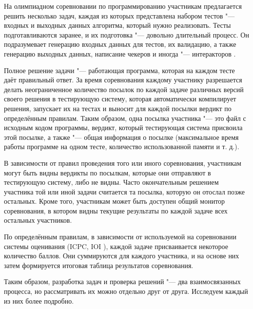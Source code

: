На олимпиадном соревновании по программированию участникам предлагается решить несколько задач, каждая из которых представлена набором тестов "--- входных и выходных данных алгоритма, который нужно реализовать. Тесты подготавливаются заранее, и их подготовка "--- довольно длительный процесс. Он подразумевает генерацию входных данных для тестов, их валидацию, а также генерацию выходных данных, написание чекеров и иногда "--- интеракторов \cite{testlib}.

Полное решение задачи "--- работающая программа, которая на каждом тесте даёт правильный ответ. За время соревнования каждому участнику разрешается делать неограниченное количество посылок по каждой задаче различных версий своего решения в тестирующую систему, которая автоматически компилирует решения, запускает их на тестах и выносит для каждой посылки вердикт по определённым правилам. Таким образом, одна посылка участника "--- это файл с исходным кодом программы, вердикт, который тестирующая система присвоила этой посылке, а также "--- общая информация о посылке (максимальное время работы программе на одном тесте, количество использованной памяти и т. д.).

В зависимости от правил проведения того или иного соревнования, участникам могут быть видны вердикты по посылкам, которые они отправляют в тестирующую систему, либо не видны. Часто окончательным решением участника той или иной задачи считается та посылка, которую он отослал позже остальных. Кроме того, участникам может быть доступен общий монитор соревнования, в котором видны текущие результаты по каждой задаче всех остальных участников.

По определённым правилам, в зависимости от используемой на соревновании системы оценивания (ICPC, IOI \cite{wiki}), каждой задаче присваивается некоторое количество баллов. Они суммируются для каждого участника, и на основе них затем формируется итоговая таблица результатов соревнования.

Таким образом, разработка задач и проверка решений "--- два взаимосвязанных процесса, но рассматривать их можно отдельно друг от друга. Исследуем каждый из них более подробно.